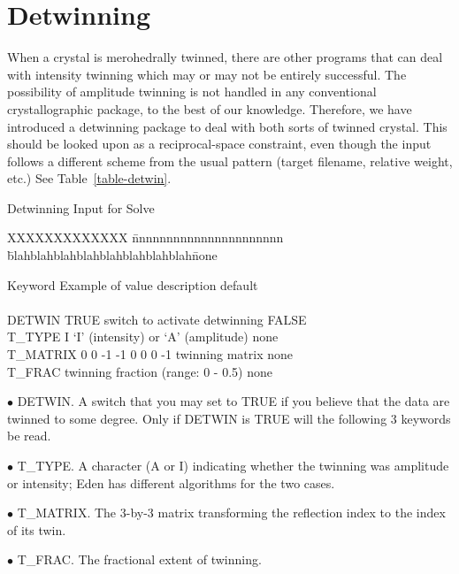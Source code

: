 \documentclass{report}
\begin{document}
{\section {Detwinning}
\label{Detwinning}

When a crystal is merohedrally twinned, there are other programs that can deal 
with intensity
twinning which may or may not be entirely successful.  The possibility
of amplitude twinning is not handled in any conventional crystallographic
package, to the best of our knowledge.
Therefore, we have introduced a detwinning package to deal with both sorts of
twinned crystal.  This should be looked upon as a reciprocal-space constraint,
even though the input follows a different scheme from the usual pattern
(target filename, relative weight, etc.)  See Table~\ref{table-detwin}.

\begin{table} [htb]
\caption {\large Detwinning Input for Solve}
\label{table-detwin}

\begin{tabbing}
XXXXXXXXXXXXX \= nnnnnnnnnnnnnnnnnnnnnn \= 
blahblahblahblahblahblahblahblah\= none \kill

Keyword \> Example of value \> description \> default \\
\\
DETWIN \> TRUE \> switch to activate detwinning \> FALSE\\
T\_TYPE \> I \> `I' (intensity) or `A' (amplitude) \> none \\
T\_MATRIX  0 0 -1 -1 0 0 0 -1 \> twinning matrix \> none\\
T\_FRAC  \> twinning fraction (range: 0 - 0.5) \> none\\
\end{tabbing} 
\end{table}

$\bullet$ DETWIN.
A switch that you may set to TRUE if you believe that
the data are twinned to some degree.
Only if DETWIN is TRUE will the following 3 keywords be read.

$\bullet$ T\_TYPE.
A character (A or I) indicating whether the twinning was amplitude or
intensity;  Eden has different algorithms for the two cases.

$\bullet$ T\_MATRIX.
The 3-by-3 matrix transforming the reflection index to the index of its twin.  

$\bullet$ T\_FRAC.
The fractional extent of twinning.

}
\end{document}
